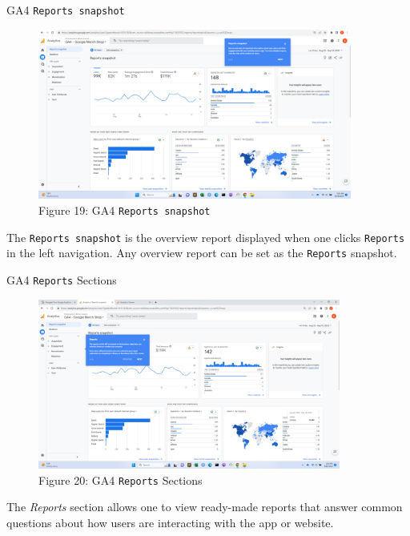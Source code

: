 \documentclass[pdf]{beamer}
\theoremstyle{remark}
\theoremstyle{definition}
\begin{document}
\begin{frame}[t]{GA4 \texttt{Reports snapshot}}
\begin{figure}[htbp]
  \captionsetup{justification=centering}
  \includegraphics[height=5.6cm, trim=1.5cm 0.0cm 2.0cm 0.0cm width=5.6cm]{Images/G4A_6b_091923_Reports_Snapshot.png}
  \caption{Figure {\color{franklinblue} 19}: GA4 \texttt{Reports snapshot}}
\end{figure}
\vspace{-2.0ex}
\small 
The \texttt{Reports snapshot} is the overview report displayed when one clicks \texttt{Reports} in the left navigation. Any overview report can be set as the \texttt{Reports} snapshot.
\end{frame}

\begin{frame}[t]{GA4 \texttt{Reports} Sections}
\begin{figure}[htbp]
  \captionsetup{justification=centering}
  \includegraphics[height=5.6cm, trim=1.5cm 0.0cm 2.0cm 0.0cm width=5.6cm]{Images/G4A_6c_091923_Reports.png}
  \caption{Figure {\color{franklinblue} 20}: GA4 \texttt{Reports} Sections}
\end{figure}
\vspace{-2.0ex}
\small 
 The \textit{Reports} section allows one to view ready-made reports that answer common questions about how users are interacting with the app or website.
\end{frame}
\end{document}
